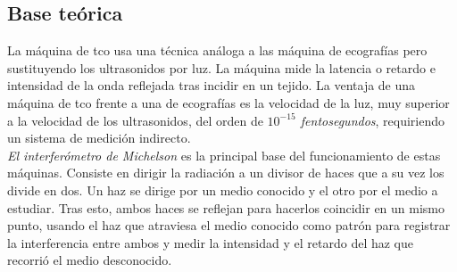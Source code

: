 \subsection{Base teórica}
La máquina de \gls{tco} usa una técnica análoga a las máquina de
ecografías pero sustituyendo los ultrasonidos por luz. La máquina mide
la latencia o retardo e intensidad de la onda reflejada tras incidir
en un tejido. La ventaja de una máquina de \gls{tco} frente a una de
ecografías es la velocidad de la luz, muy superior a la velocidad de
los ultrasonidos, del orden de \emph{$10^{-15}$ fentosegundos},
requiriendo un sistema de medición indirecto.\\
\emph{El interferómetro de Michelson} es la principal base del
funcionamiento de estas máquinas. Consiste en dirigir la radiación a
un divisor de haces que a su vez los divide en dos. Un haz se dirige
por un medio conocido y el otro por el medio a estudiar. Tras esto,
ambos haces se reflejan para hacerlos coincidir en un mismo punto,
usando el haz que atraviesa el medio conocido como patrón para
registrar la interferencia entre ambos y medir la intensidad y el
retardo del haz que recorrió el medio desconocido.

